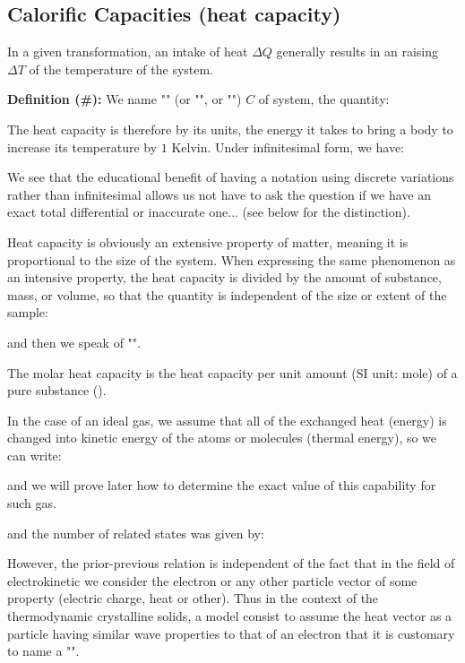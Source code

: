 	\subsection{Calorific Capacities (heat capacity)}
	In a given transformation, an intake  of heat $\Delta Q$ generally results in an raising $\Delta T$ of the temperature of the system.

	\textbf{Definition (\#\mydef):} 
	We name "" (or "", or "") $C$ of system, the quantity:
	
	The heat capacity is therefore by its units, the energy it takes to bring a body to increase its temperature by $1$ Kelvin. Under infinitesimal form, we have:
	
	We see that the educational benefit of having a notation using discrete variations rather than infinitesimal allows us not have to ask the question if we have an exact total differential or inaccurate one... (see below for the distinction).
	
	Heat capacity is obviously an extensive property of matter, meaning it is proportional to the size of the system. When expressing the same phenomenon as an intensive property, the heat capacity is divided by the amount of substance, mass, or volume, so that the quantity is independent of the size or extent of the sample:
	
	and then we speak of "".
	
	The molar heat capacity is the heat capacity per unit amount (SI unit: mole) of a pure substance ().
	
	In the case of an ideal gas, we assume that all of the exchanged heat (energy) is changed into kinetic energy of the atoms or molecules (thermal energy), so we can write:
	
	and we will prove later how to determine the exact value of this capability for such gas.
	
	
	and the number of related states was given by:
	
	However, the prior-previous relation is independent of the fact that in the field of electrokinetic we consider the electron or any other particle vector of some property (electric charge, heat or other). Thus in the context of the thermodynamic crystalline solids, a model consist to assume the heat vector as a particle having similar  wave properties to that of an electron that it is customary to name a "".
	
